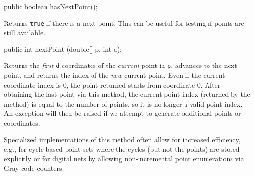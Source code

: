 \begin{htmlonly}
\end{htmlonly}
\begin{code}

   public boolean hasNextPoint();
\end{code}
 \begin{tabb}
   Returns \texttt{true} if there is a next point.
   This can be useful for testing if points are still available.
 \end{tabb}
\begin{htmlonly}
\end{htmlonly}
\begin{code}

   public int nextPoint (double[] p, int d);\begin{hide}
}\end{hide}
\end{code}
 \begin{tabb}
   Returns the \emph{first} \texttt{d} coordinates of the \emph{current} 
   point in \texttt{p}, advances to the next point, and
   returns the index of the \emph{new} current point.
   Even if the current coordinate index is 0, the point returned
   starts from coordinate 0.
   After obtaining the last point via this method, the current point
   index (returned by the method) is equal to the number of points,
   so it is no longer a valid point index.
   An exception will then be raised if we attempt to generate additional
   points or coordinates.

  Specialized implementations of this method often allow for increased 
  efficiency, e.g., for cycle-based point sets where the cycles 
  (but not the points)
  are stored explicitly or for digital nets  
  by allowing non-incremental point enumerations via Gray-code counters.
 \end{tabb}
\begin{htmlonly}
\end{htmlonly}
